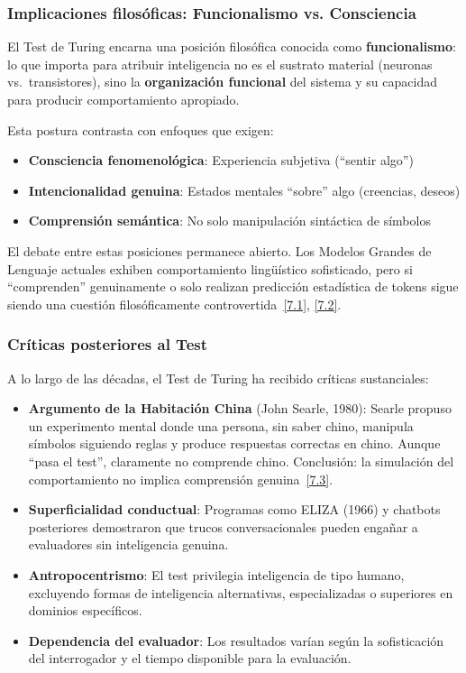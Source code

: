 \documentclass[12pt,a4paper]{report}
\numberwithin{figure}{section}
\begin{document}
\subsubsection[Funcionalismo vs. Consciencia]{Implicaciones filosóficas: Funcionalismo vs. Consciencia}
\label{subsubsec:funcionalismo}

El Test de Turing encarna una posición filosófica conocida como \textbf{funcionalismo}: lo que importa para atribuir inteligencia no es el sustrato material (neuronas vs.\ transistores), sino la \textbf{organización funcional} del sistema y su capacidad para producir comportamiento apropiado.

Esta postura contrasta con enfoques que exigen:
\begin{itemize}
    \item \textbf{Consciencia fenomenológica}: Experiencia subjetiva (``sentir algo'')
    \item \textbf{Intencionalidad genuina}: Estados mentales ``sobre'' algo (creencias, deseos)
    \item \textbf{Comprensión semántica}: No solo manipulación sintáctica de símbolos
\end{itemize}

El debate entre estas posiciones permanece abierto. Los Modelos Grandes de Lenguaje actuales exhiben comportamiento lingüístico sofisticado, pero si ``comprenden'' genuinamente o solo realizan predicción estadística de tokens sigue siendo una cuestión filosóficamente controvertida~\hyperref[ref:7.1]{[7.1]}, \hyperref[ref:7.2]{[7.2]}.

\subsubsection{Críticas posteriores al Test}
\label{subsubsec:criticas_turing}

A lo largo de las décadas, el Test de Turing ha recibido críticas sustanciales:

\begin{itemize}
    \item \textbf{Argumento de la Habitación China} (John Searle, 1980): Searle propuso un experimento mental donde una persona, sin saber chino, manipula símbolos siguiendo reglas y produce respuestas correctas en chino. Aunque ``pasa el test'', claramente no comprende chino. Conclusión: la simulación del comportamiento no implica comprensión genuina~\hyperref[ref:7.3]{[7.3]}.
    
    \item \textbf{Superficialidad conductual}: Programas como ELIZA (1966) y chatbots posteriores demostraron que trucos conversacionales pueden engañar a evaluadores sin inteligencia genuina.
    
    \item \textbf{Antropocentrismo}: El test privilegia inteligencia de tipo humano, excluyendo formas de inteligencia alternativas, especializadas o superiores en dominios específicos.
    
    \item \textbf{Dependencia del evaluador}: Los resultados varían según la sofisticación del interrogador y el tiempo disponible para la evaluación.
\end{itemize}
\end{document}
